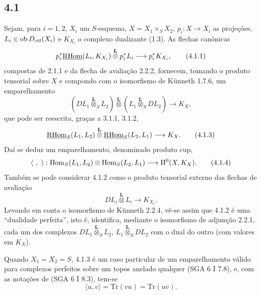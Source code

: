 \subsection*{4.1}
Sejam, para $i=1,2$, $X_i$ um $S$-esquema, $X=X_1\times_SX_2$, $p_i:X\to X_i$ as projeções, $L_i\in\operatorname{ob}D_{\mathrm{ctf}}(X_i)$ e $K_{X_i}$ o complexo dualizante (1.3). As flechas canônicas
\begin{equation}
p_i^*\underline{\mathrm{RHom}}(L_i,K_{X_i})\overset{\mathbf L}{\otimes}p_i^*L_i
\longrightarrow p_i^*K_{X_i},
\tag{4.1.1}
\end{equation}
compostas de 2.1.1 e da flecha de avaliação 2.2.2, fornecem, tomando o produto tensorial sobre $X$ e compondo com o isomorfismo de Künneth 1.7.6, um emparelhamento
\begin{equation}
(DL_1\overset{\mathbf L}{\otimes}_S L_2)\overset{\mathbf L}{\otimes}(L_1\overset{\mathbf L}{\otimes}_S DL_2)
\longrightarrow K_X,
\tag{4.1.2}
\end{equation}
que pode ser reescrita, graças a 3.1.1, 3.1.2,
\begin{equation}
\underline{\mathrm{RHom}}_S(L_1,L_2)\overset{\mathbf L}{\otimes}\underline{\mathrm{RHom}}_S(L_2,L_1)
\longrightarrow K_X.
\tag{4.1.3}
\end{equation}
Daí se deduz um emparelhamento, denominado produto cup,
\begin{equation}
\langle\ ,\ \rangle:\Hom_S(L_1,L_2)\otimes\Hom_S(L_2,L_1)
\longrightarrow \H^0(X,K_X).
\tag{4.1.4}
\end{equation}
Também se pode considerar 4.1.2 como o produto tensorial externo das flechas de avaliação
\[
DL_i\overset{\mathbf L}{\otimes}L_i\longrightarrow K_{X_i}.
\]
Levando em conta o isomorfismo de Künneth 2.2.4, vê-se assim que 4.1.2 é uma ``dualidade perfeita'', isto é, identifica, mediante o isomorfismo de adjunção 2.2.1, cada um dos complexos $DL_1\overset{\mathbf L}{\otimes}_S L_2$, $L_1\overset{\mathbf L}{\otimes}_S DL_2$ com o dual do outro (com valores em $K_X$).

Quando $X_1=X_2=S$, 4.1.3 é um caso particular de um emparelhamento válido para complexos perfeitos sobre um topos anelado qualquer (SGA 6 I 7.8), e, com as notações de (SGA 6 I 8.3), tem-se
\begin{equation}
\langle u,v\rangle=\mathrm{Tr}(vu)=\mathrm{Tr}(uv).
\tag{4.1.5}
\end{equation}

